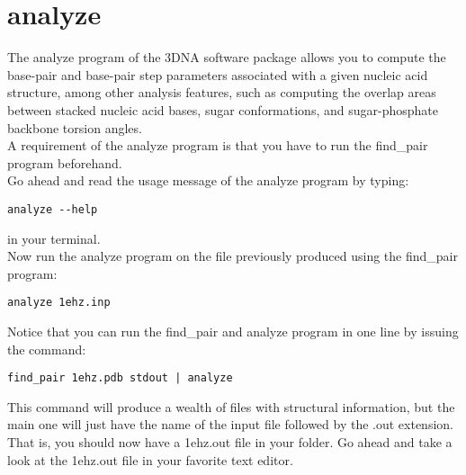 \section{analyze}
The \textrm{analyze}  program of the 3DNA software  package allows you
to compute the base-pair and  base-pair step parameters associated with a
given nucleic  acid structure, among  other analysis features,  such as
computing the overlap areas  between stacked nucleic acid bases, sugar
conformations, and sugar-phosphate backbone torsion angles.\\
A requirement of the \textrm{analyze} program is that you have to run the
\textrm{find\_pair} program beforehand.\\
Go ahead and read the usage message of the analyze program by typing:
\begin{Verbatim}
analyze --help
\end{Verbatim}
in your terminal.\\

\noindent Now run the analyze  program on the file previously produced
using the \textrm{find\_pair} program:
\begin{Verbatim}
analyze 1ehz.inp
\end{Verbatim}
Notice that  you can run the  \textrm{find\_pair} and \textrm{analyze}
program in one line by issuing the command:
\begin{Verbatim}
find_pair 1ehz.pdb stdout | analyze
\end{Verbatim}
This  command   will  produce  a  wealth  of   files  with  structural
information, but  the main one  will just have  the name of  the input
file followed  by the .out extension.  That is, you should  now have a
1ehz.out file in your folder. Go ahead and take a look at the 1ehz.out
file in your favorite text editor.

